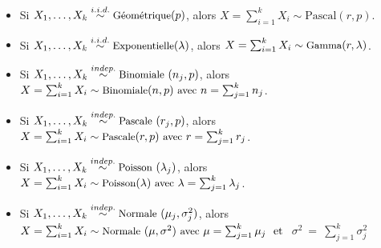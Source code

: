 \documentclass[12pt,french]{article}
\begin{document}
{\small
\vspace{0.1 cm}
\begin{itemize}
\item Si $X_1, \ldots, X_k \overset{i.i.d.}{\sim} \mbox{\small Géométrique}(p)$, alors $X = \sum_{i=1}^k X_i \sim \mbox{Pascal}(r,p)$.
\item Si $X_1, \ldots, X_k \overset{i.i.d.}{\sim} \mbox{\small Exponentielle}(\lambda)$, alors $X = \sum_{i=1}^k X_i \sim \mbox{\small Gamma}(r,\lambda)$.
\item Si $X_1, \ldots, X_k \overset{indep.}{\sim} \mbox{\small Binomiale}~ (n_j, p) $, alors $X = \sum_{i=1}^k X_i \sim \mbox{\small Binomiale}(n,p)~ \mbox{\small avec}~n = \sum_{j=1}^k n_j$.
\item Si $X_1, \ldots, X_k \overset{indep.}{\sim} \mbox{\small Pascale}~ (r_j, p) $, alors $X = \sum_{i=1}^k X_i \sim \mbox{\small Pascale}(r,p)~ \mbox{\small avec}~r = \sum_{j=1}^k r_j$.
\item Si $X_1, \ldots, X_k \overset{indep.}{\sim} \mbox{\small Poisson}~ (\lambda_j) $, alors $X = \sum_{i=1}^k X_i \sim \mbox{\small Poisson}(\lambda)~ \mbox{\small avec}~\lambda = \sum_{j=1}^k \lambda_j $.
\item Si $X_1, \ldots, X_k \overset{indep.}{\sim} \mbox{\small Normale}~(\mu_j, \sigma^2_j)$, alors $X = \sum_{i=1}^k X_i \sim \mbox{\small Normale}~(\mu, \sigma^2)~ \mbox{\small avec}~ \mu = \sum_{j=1}^k \mu_j~~
\mbox{et }$ $\sigma^2~=~\sum_{j=1}^k \sigma^2_j$
\end{itemize}
}
%
%
\end{document}
